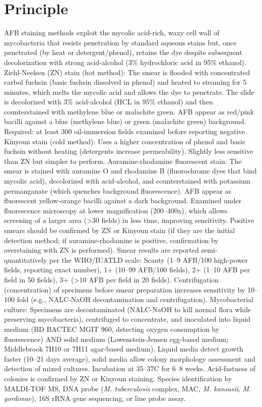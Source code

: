 \section*{Principle}
AFB staining methods exploit the mycolic acid-rich, waxy cell wall of mycobacteria that resists penetration by standard aqueous stains but, once penetrated (by heat or detergent/phenol), retains the dye despite subsequent decolorization with strong acid-alcohol (3\% hydrochloric acid in 95\% ethanol). Ziehl-Neelsen (ZN) stain (hot method): The smear is flooded with concentrated carbol fuchsin (basic fuchsin dissolved in phenol) and heated to steaming for 5 minutes, which melts the mycolic acid and allows the dye to penetrate. The slide is decolorized with 3\% acid-alcohol (HCL in 95\% ethanol) and then counterstained with methylene blue or malachite green. AFB appear as red/pink bacilli against a blue (methylene blue) or green (malachite green) background. Required: at least 300 oil-immersion fields examined before reporting negative. Kinyoun stain (cold method): Uses a higher concentration of phenol and basic fuchsin without heating (detergents increase permeability). Slightly less sensitive than ZN but simpler to perform. Auramine-rhodamine fluorescent stain: The smear is stained with auramine O and rhodamine B (fluorochrome dyes that bind mycolic acid), decolorized with acid-alcohol, and counterstained with potassium permanganate (which quenches background fluorescence). AFB appear as fluorescent yellow-orange bacilli against a dark background. Examined under fluorescence microscopy at lower magnification (200--400x), which allows screening of a larger area (>30 fields) in less time, improving sensitivity. Positive smears should be confirmed by ZN or Kinyoun stain (if they are the initial detection method; if auramine-rhodamine is positive, confirmation by overstaining with ZN is performed). Smear results are reported semi-quantitatively per the WHO/IUATLD scale: Scanty (1--9 AFB/100 high-power fields, reporting exact number), 1+ (10--99 AFB/100 fields), 2+ (1--10 AFB per field in 50 fields), 3+ (>10 AFB per field in 20 fields). Centrifugation (concentration) of specimens before smear preparation increases sensitivity by 10--100 fold (e.g., NALC-NaOH decontamination and centrifugation). Mycobacterial culture: Specimens are decontaminated (NALC-NaOH to kill normal flora while preserving mycobacteria), centrifuged to concentrate, and inoculated into liquid medium (BD BACTEC MGIT 960, detecting oxygen consumption by fluorescence) AND solid medium (Lowenstein-Jensen egg-based medium; Middlebrook 7H10 or 7H11 agar-based medium). Liquid media detect growth faster (10--21 days average), solid media allow colony morphology assessment and detection of mixed cultures. Incubation at 35--37\textdegree{}C for 6--8 weeks. Acid-fastness of colonies is confirmed by ZN or Kinyoun staining. Species identification by MALDI-TOF MS, DNA probe (\textit{M. tuberculosis} complex, MAC, \textit{M. kansasii}, \textit{M. gordonae}), 16S rRNA gene sequencing, or line probe assay.

